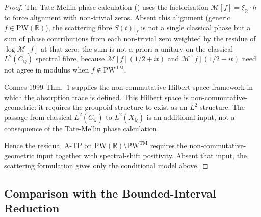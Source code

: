 \begin{proof}
The Tate-Mellin phase calculation
() uses the factorisation
\(\mathcal{M}[f]=\xi_{\mathbb{R}}\cdot h\) to force alignment with
non-trivial zeros. Absent this alignment (generic
\(f\in\mathrm{PW}(\mathbb{R})\)), the scattering fibre \(S(t)|_{f}\) is
not a single classical phase but a sum of phase contributions from
each non-trivial zero weighted by the residue of \(\log\mathcal{M}[f]\)
at that zero; the sum is not a priori a unitary on the classical
\(L^{2}(C_{\mathbb{Q}})\) spectral fibre, because
\(\mathcal{M}[f](1/2+it)\) and \(\mathcal{M}[f](1/2-it)\) need not
agree in modulus when \(f\notin\mathrm{PW}^{\mathrm{TM}}\).

Connes 1999 Thm.~1 supplies the non-commutative Hilbert-space
framework in which the absorption trace is defined. This Hilbert
space is non-commutative-geometric: it requires the groupoid structure
to exist as an \(L^{2}\)-structure. The passage from classical
\(L^{2}(C_{\mathbb{Q}})\) to \(L^{2}(X_{\mathbb{Q}})\) is an additional
input, not a consequence of the Tate-Mellin phase calculation.

Hence the residual A-TP on
\(\mathrm{PW}(\mathbb{R})\setminus\mathrm{PW}^{\mathrm{TM}}\) requires
the non-commutative-geometric input together with spectral-shift
positivity. Absent that input, the scattering formulation gives only
the conditional model above.
\end{proof}

\subsection{Comparison with the Bounded-Interval Reduction}
\label{v4-arith:w7-j:comparison}

